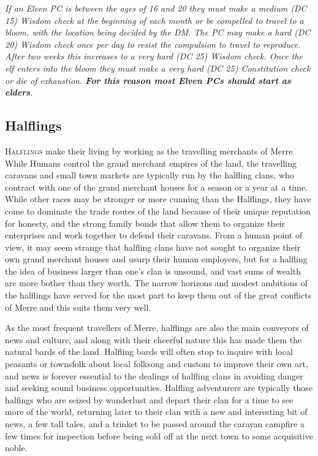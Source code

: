 \documentclass[paper=a4, fontsize=11pt]{scrartcl} %
\begin{document}
\begin{multicols}{2}
\textit{If an Elven PC is between the ages of 16 and 20 they must make a medium (DC 15) Wisdom check at the beginning of each month or be compelled to travel to a bloom, with the location being decided by the DM. The PC may make a hard (DC 20) Wisdom check once per day to resist the compulsion to travel to reproduce. After two weeks this increases to a very hard (DC 25) Wisdom check. Once the elf enters into the bloom they must make a very hard (DC 25) Constitution check or die of exhaustion. \textbf{For this reason most Elven PCs should start as elders}. }

\subsection{Halflings}

\lettrine[lines=2]{\medievalsharp H}{alflings} make their living by working as the travelling merchants of Merre. While Humans control the grand merchant empires of the land, the travelling caravans and small town markets are typically run by the halfling clans, who contract with one of the grand merchant houses for a season or a year at a time. While other races may be stronger or more cunning than the Halflings, they have come to dominate the trade routes of the land because of their unique reputation for honesty, and the strong family bonds that allow them to organize their enterprises and work together to defend their caravans. From a human point of view, it may seem strange that halfling clans have not sought to organize their own grand merchant houses and usurp their human employers, but for a halfling the idea of business larger than one's clan is unsound, and vast sums of wealth are more bother than they worth. The narrow horizons and modest ambitions of the halflings have served for the most part to keep them out of the great conflicts of Merre and this suits them very well.

As the most frequent travellers of Merre, halflings are also the main conveyors of news and culture, and along with their cheerful nature this has made them the natural bards of the land. Halfling bards will often stop to inquire with local peasants or townsfolk about local folksong and custom to improve their own art, and news is forever essential to the dealings of halfling clans in avoiding danger and seeking sound business opportunities. Halfling adventurers are typically those halfings who are seized by wanderlust and depart their clan for a time to see more of the world, returning later to their clan with a new and interesting bit of news, a few tall tales, and a trinket to be passed around the caravan campfire a few times for inspection before being sold off at the next town to some acquisitive noble.


\end{multicols}
\end{document}
